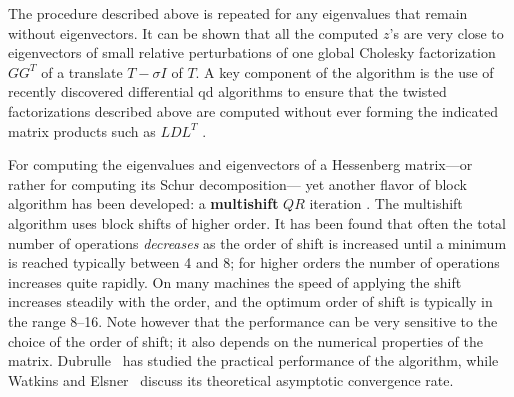 The procedure described above is repeated for any eigenvalues that
remain without eigenvectors.  It can be shown that all the computed
$z$'s are very close to eigenvectors of small relative perturbations of
one global Cholesky factorization $GG^T$ of a translate $T - \sigma I$
of $T$.  A key
component of the algorithm is the use of recently discovered
differential qd algorithms to ensure that the twisted factorizations
described above are computed without ever forming the indicated
matrix products such as $LDL^T$ \cite{fernandoparlett}.

For computing the eigenvalues and eigenvectors of a Hessenberg
matrix---or rather for computing its Schur decomposition--- yet another
flavor of block algorithm has been developed: a {\bf multishift}
$QR$ iteration
\cite{baidemmel89}. 
The multishift algorithm uses block shifts of
higher order. It has been found that often the total number of operations
{\em decreases} as the order of shift is increased until a minimum
is reached typically between 4 and 8; for higher orders the number of
operations increases quite rapidly. On many machines
the speed of applying the shift
increases steadily with the order, and the optimum order of shift is
typically in the range 8--16. Note however that the performance can be
very sensitive to the choice of the order of shift; it also depends on
the numerical properties of the matrix. Dubrulle~\cite{dubrulle} has
studied the practical performance of the algorithm, while Watkins and
Elsner~\cite{watkinselsner} discuss its theoretical asymptotic convergence
rate.


